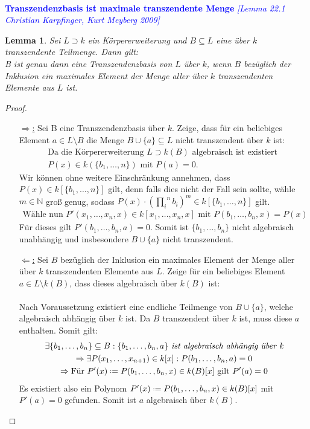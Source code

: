 \documentclass[10pt,a4paper]{report}
\newcommand{\Algebra}{Christian Karpfinger, Kurt Meyberg 2009}
\newcounter{Aussage}[chapter]
\newtheorem{lemma}[Aussage]{Lemma}
\newcommand*{\defeq}{\mathrel{\vcenter{\baselineskip0.5ex \lineskiplimit0pt
                     \hbox{\scriptsize.}\hbox{\scriptsize.}}}%
                     =}
\begin{document}
\ \\
\textcolor{blue}{\textbf{Transzendenzbasis ist maximale transzendente Menge} \textit{[Lemma 22.1 \Algebra]}}
\begin{lemma}\label{Transzendenzbasis ist maximale transzendente Menge}
Sei $L \supset k$ ein Körpererweiterung und $B \subseteq L$ eine über $k$ transzendente Teilmenge. Dann gilt:\\
B ist genau dann eine Transzendenzbasis von $L$ über $k$, wenn $B$ bezüglich der Inklusion ein maximales Element der Menge aller über $k$ transzendenten Elemente aus $L$ ist.
\end{lemma}
\begin{proof} \ \\
\begin{itemize}
\item[\underline{\glqq $\Rightarrow$:\grqq}] Sei B eine Transzendenzbasis über $k$. Zeige, dass für ein beliebiges Element $a \in L \setminus B$ die Menge $B \cup \lbrace a \rbrace \subseteq L$ nicht transzendent über $k$ ist:
\begin{gather*}
\text{Da die Körpererweiterung $L \supset k(B)$ algebraisch ist existiert }\\
P(x) \in k(\lbrace b_1, \dots ,n \rbrace) \text{ mit } P(a) = 0.
\end{gather*}
Wir können ohne weitere Einschränkung annehmen, dass $P(x) \in k[\lbrace b_1, \dots ,n \rbrace]$ gilt, denn falls dies nicht der Fall sein sollte, wähle $m \in \mathbb{N}$ groß genug, sodass $P(x) \cdot \left( {\prod_i}^n b_i \right)^m \in k[\lbrace b_1, \dots ,n \rbrace]$ gilt.
\begin{gather*}
\text{Wähle nun } P'(x_1, \dots , x_n , x) \in  k[x_1, \dots , x_n , x] \text{ mit } P(b_1, \dots , b_n, x) = P(x)
\end{gather*}
Für dieses gilt $P'(b_1, \dots , b_n , a) = 0$. Somit ist $\lbrace b_1, \dots, b_n \rbrace$ nicht algebraisch unabhängig und insbesondere $B \cup \lbrace a \rbrace$ nicht transzendent.
\item[\underline{\glqq $\Leftarrow$:\grqq}] Sei $B$ bezüglich der Inklusion ein maximales Element der Menge aller über $k$ transzendenten Elemente aus $L$. Zeige für ein beliebiges Element $a \in L \setminus k(B)$, dass dieses algebraisch über $k(B)$ ist:\\
\ \\
Nach Voraussetzung existiert eine endliche Teilmenge von $B \cup \lbrace a \rbrace$, welche algebraisch abhängig über $k$ ist. Da $B$ transzendent über $k$ ist, muss diese $a$ enthalten. Somit gilt:
\begin{gather*}
\exists \lbrace b_1, \dots, b_n \rbrace \subseteq B : \lbrace b_1, \dots, b_n ,a \rbrace \textit{ ist algebraisch abhängig über k}\\
\Rightarrow \exists P(x_1, \dots, x_{n+1}) \in k[x] : P(b_1, \dots , b_n , a) = 0 \\
\Rightarrow \text{Für } P'(x) \defeq P(b_1, \dots , b_n , x) \in k(B)[x] \text{ gilt } P'(a) = 0
\end{gather*}
Es existiert also ein Polynom $P'(x) \defeq P(b_1, \dots , b_n , x) \in k(B)[x]$ mit $P'(a) = 0$ gefunden. Somit ist $a$ algebraisch über $k(B)$.
\end{itemize}
\end{proof}
\end{document}
